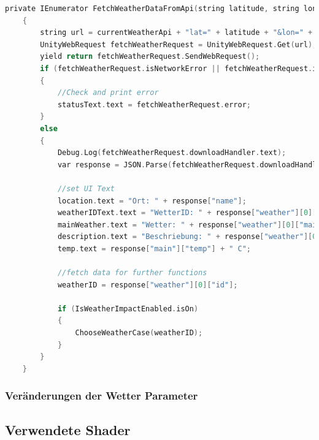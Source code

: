 \begin{lstlisting}[language=C,caption={Die \texttt{ARPlaceObject()} Funktion.},captionpos=b,label=lst:arplaceobject-funktion]
private IEnumerator FetchWeatherDataFromApi(string latitude, string longitude)
    {
        string url = currentWeatherApi + "lat=" + latitude + "&lon=" + longitude + "&appid=" + apiKey + "&units=metric";
        UnityWebRequest fetchWeatherRequest = UnityWebRequest.Get(url);
        yield return fetchWeatherRequest.SendWebRequest();
        if (fetchWeatherRequest.isNetworkError || fetchWeatherRequest.isHttpError)
        {
            //Check and print error
            statusText.text = fetchWeatherRequest.error;
        }
        else
        {
            Debug.Log(fetchWeatherRequest.downloadHandler.text);
            var response = JSON.Parse(fetchWeatherRequest.downloadHandler.text);

            //set UI Text
            location.text = "Ort: " + response["name"];
            weatherIDText.text = "WetterID: " + response["weather"][0]["id"];
            mainWeather.text = "Wetter: " + response["weather"][0]["main"];
            description.text = "Beschriebung: " + response["weather"][0]["description"];
            temp.text = response["main"]["temp"] + " C";

            //fetch data for further functions
            weatherID = response["weather"][0]["id"];

            if (IsWeatherImpactEnabled.isOn)
            {
                ChooseWeatherCase(weatherID);
            }
        }
    }
\end{lstlisting}
    


\subsubsection{Veränderungen der Wetter Parameter}

\subsection{Verwendete Shader}